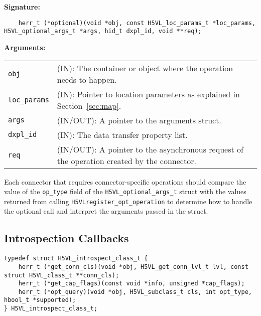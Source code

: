 \begin{mdframed}[style=bgbox]
\textbf{Signature:}
\begin{lstlisting}
    herr_t (*optional)(void *obj, const H5VL_loc_params_t *loc_params, H5VL_optional_args_t *args, hid_t dxpl_id, void **req);
\end{lstlisting}

\textbf{Arguments:}\\
\begin{tabular}{l p{13.5cm}}
  \texttt{obj} & (IN): The container or object where the operation needs to happen.\\
  \texttt{loc\_params} & (IN): Pointer to location parameters as explained in Section~\ref{sec:map}.\\
  \texttt{args} & (IN/OUT): A pointer to the arguments struct.\\
  \texttt{dxpl\_id} & (IN): The data transfer property list.\\
  \texttt{req} & (IN/OUT): A pointer to the asynchronous request of the operation created by the connector.\\
\end{tabular}
\end{mdframed}

Each connector that requires connector-specific operations should compare the
value of the {\tt op\_type} field of the {\tt H5VL\_optional\_args\_t} struct
with the values returned from calling {\tt H5VLregister\_opt\_operation} to
determine how to handle the optional call and interpret the arguments passed
in the struct.



\subsection{Introspection Callbacks}

\begin{lstlisting}[caption={Structure for VOL connector introspection callback routines, H5VLconnector.h}, captionpos=b, label={lst:Introspectclass}]
typedef struct H5VL_introspect_class_t {                                            
    herr_t (*get_conn_cls)(void *obj, H5VL_get_conn_lvl_t lvl, const struct H5VL_class_t **conn_cls);
    herr_t (*get_cap_flags)(const void *info, unsigned *cap_flags);
    herr_t (*opt_query)(void *obj, H5VL_subclass_t cls, int opt_type, hbool_t *supported);
} H5VL_introspect_class_t;
\end{lstlisting}

